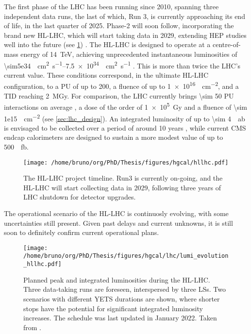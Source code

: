 \documentclass[11pt]{article}
\begin{document}
The first phase of the \ac{LHC} has been running since 2010, spanning three independent data runs, the last of which, Run 3, is currently approaching its end of life, in the last quarter of 2025.
Phase-2 will soon follow, incorporating the brand new \ac{HL-LHC}, which will start taking data in 2029, extending \ac{HEP} studies well into the future (see \cref{fig:hllhc}) \cite{hllhc_evolution_paper1,hllhc_evolution_paper2}.
The \ac{HL-LHC} is designed to operate at a centre-of-mass energy of \SI{14}{\TeV}, achieving unprecedented instantaneous luminosities of \SIrange{\sim5e34}{7.5e34}{\per\cm\squared\per\second} \cite{hllhc}.
This is more than twice the \ac{LHC}’s current value.
These conditions correspond, in the ultimate HL-LHC configuration, to a \ac{PU} of up to 200, a fluence of up to \SI{1e16}{\nequiv\per\cm\squared}, and a \ac{TID} reaching \SI{2}{\mega\gray}.
For comparison, the \ac{LHC} currently brings \num{\sim 50} \ac{PU} interactions on average \cite{pileup_twiki}, a dose of the order of \SI{1e5}{\gray} and a fluence of \SI{\sim 1e15}{\nequiv\per\cm\squared} \cite{lhc_fluences} (see \cref{sec:lhc_design}).
An integrated luminosity of up to \SI{\sim 4}{\per\atto\barn} is envisaged to be collected over a period of around 10 years \cite{hllhc}, while current \ac{CMS} endcap calorimeters are designed to sustain a more modest value of up to \SI{500}{\per\femto\barn}.

\begin{figure}[htbp]
\centering
\texttt{[image: /home/bruno/org/PhD/Thesis/figures/hgcal/hllhc.pdf]}
\caption{\label{fig:hllhc}The \ac{HL-LHC} project timeline. Run3 is currently on-going, and the \ac{HL-LHC} will start collecting data in 2029, following three years of \ac{LHC} shutdown for detector upgrades.}
\end{figure}

The operational scenario of the \ac{HL-LHC} is continuosly evolving, with some uncertainties still present.
Given past delays and current unknowns, it is still soon to definitely confirm current operational plans.

\begin{figure}
\texttt{[image: /home/bruno/org/PhD/Thesis/figures/hgcal/lhc/lumi\_evolution\_hllhc.pdf]}
\caption{\label{fig:lumi_plans_hllhc}Planned peak and integrated luminosities during the \ac{HL-LHC}. Three data-taking runs are foreseen, interspersed by three \acp{LS}. Two scenarios with different \ac{YETS} durations are shown, where shorter stops have the potential for significant integrated luminosity increases. The schedule was last updated in January 2022. Taken from \cite{hllhc_evolution_paper2}.}
\end{figure}
\end{document}
